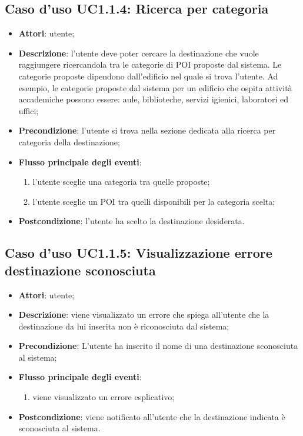 \documentclass[../AnalisiDeiRequisiti.tex]{subfiles}
\begin{document}
\subsection{Caso d'uso UC1.1.4: Ricerca per categoria}
\begin{itemize}
\item \textbf{Attori}: utente;
\item \textbf{Descrizione}: l'utente deve poter cercare la destinazione che vuole raggiungere ricercandola tra le categorie di POI proposte dal sistema. Le categorie proposte dipendono dall'edificio nel quale si trova l'utente. Ad esempio, le categorie proposte dal sistema per un edificio che ospita attività accademiche possono essere: aule, biblioteche, servizi igienici, laboratori ed uffici; 
      \item \textbf{Precondizione}: l'utente si trova nella sezione dedicata alla ricerca per categoria della destinazione;

        \item \textbf{Flusso principale degli eventi}:
          \begin{enumerate}
          \item l'utente sceglie una categoria tra quelle proposte;
          \item l'utente sceglie un POI tra quelli disponibili per la categoria scelta;

      \end{enumerate}
    \item \textbf{Postcondizione}: l'utente ha scelto la destinazione desiderata.
  \end{itemize}
\hypertarget{UC1.1.5}{}
\subsection{Caso d'uso UC1.1.5: Visualizzazione errore destinazione sconosciuta}
\begin{itemize}
\item \textbf{Attori}: utente;
\item \textbf{Descrizione}: viene visualizzato un errore che spiega all'utente che la destinazione da lui inserita non è riconosciuta dal sistema; 
      \item \textbf{Precondizione}: L'utente ha inserito il nome di una destinazione sconosciuta al sistema;

        \item \textbf{Flusso principale degli eventi}:
          \begin{enumerate}
          \item viene visualizzato un errore esplicativo;

      \end{enumerate}
    \item \textbf{Postcondizione}: viene notificato all'utente che la destinazione indicata è sconosciuta al sistema.
  \end{itemize}
\hypertarget{UC1.2}{}
\end{document}
